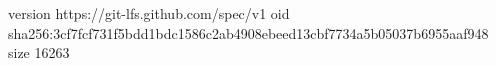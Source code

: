 version https://git-lfs.github.com/spec/v1
oid sha256:3cf7fcf731f5bdd1bdc1586c2ab4908ebeed13cbf7734a5b05037b6955aaf948
size 16263
